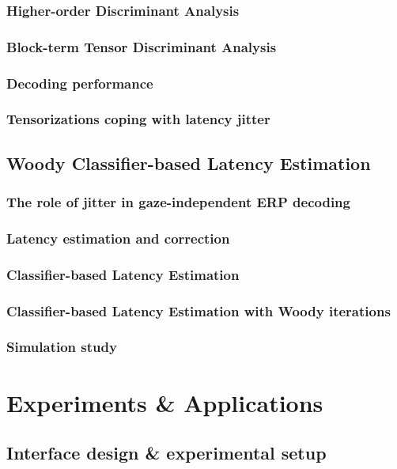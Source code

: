 \section{Higher-order Discriminant Analysis}
\section{Block-term Tensor Discriminant Analysis}
\section{Decoding performance}
\section{Tensorizations coping with latency jitter}

\chapter{Woody Classifier-based Latency Estimation}
\section{The role of jitter in gaze-independent ERP decoding}
\section{Latency estimation and correction}
\section{Classifier-based Latency Estimation}
\section{Classifier-based Latency Estimation with Woody iterations}
\section{Simulation study}

\part{Experiments \& Applications}

\chapter{Interface design \& experimental setup}

